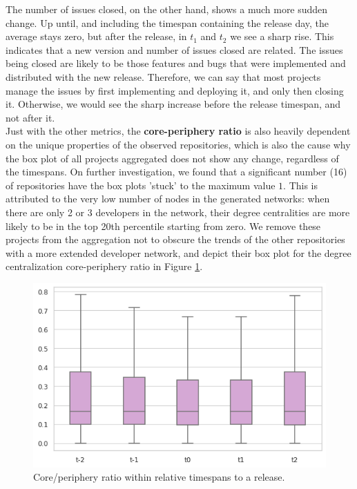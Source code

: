 The number of issues closed, on the other hand, shows a much more sudden change. Up until, and including the timespan containing the release day, the average stays zero, but after the release, in $t_1$ and $t_2$ we see a sharp rise. This indicates that a new version and number of issues closed are related. The issues being closed are likely to be those features and bugs that were implemented and distributed with the new release. Therefore, we can say that most projects manage the issues by first implementing and deploying it, and only then closing it. Otherwise, we would see the sharp increase before the release timespan, and not after it. \\

Just with the other metrics, the \textbf{core-periphery ratio} is also heavily dependent on the unique properties of the observed repositories, which is also the cause why the box plot of all projects aggregated does not show any change, regardless of the timespans. On further investigation, we found that a significant number (16) of repositories have the box plots 'stuck' to the maximum value $1$. This is attributed to the very low number of nodes in the generated networks: when there are only 2 or 3 developers in the network, their degree centralities are more likely to be in the top 20th percentile starting from zero. We remove these projects from the aggregation not to obscure the trends of the other repositories with a more extended developer network, and depict their box plot for the degree centralization core-periphery ratio in Figure \ref{fig:cp-box}.

\begin{figure}
    \centering
    \includegraphics[width=\textwidth]{figures/quantitative/boxplots/cp-ratio.png}
    \caption{Core/periphery ratio within relative timespans to a release.}
    \label{fig:cp-box}
\end{figure}

